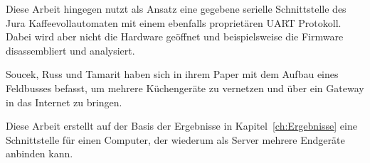 Diese Arbeit hingegen nutzt als Ansatz eine gegebene serielle Schnittstelle des Jura Kaffeevollautomaten mit einem ebenfalls proprietären \ac{UART} Protokoll.
Dabei wird aber nicht die Hardware geöffnet und beispielsweise die Firmware disassembliert und analysiert.

Soucek, Russ und Tamarit haben sich in ihrem Paper \cite{soucek2000smart} mit dem Aufbau eines Feldbusses befasst, um mehrere Küchengeräte zu vernetzen und über ein Gateway in das Internet zu bringen.

Diese Arbeit erstellt auf der Basis der Ergebnisse in Kapitel~\ref{ch:Ergebnisse} eine Schnittstelle für einen Computer, der wiederum als Server mehrere Endgeräte anbinden kann.
